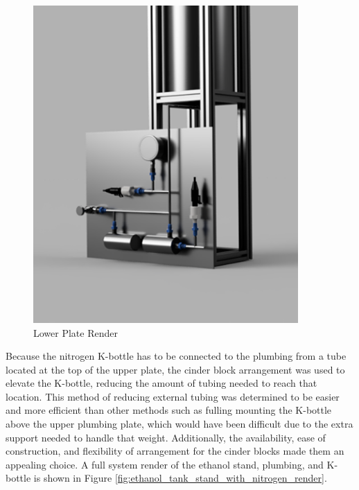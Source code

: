 \documentclass[9pt]{article} %
\numberwithin{equation}{section} %
\begin{document}
\begin{figure}[!htb]
\begin{minipage}{0.49\textwidth}
        \includegraphics[scale=0.5, width=0.9\textwidth]{lower_plate.png} %
        \caption{Lower Plate Render}
        \label{fig:lower_plate_render}
    \end{minipage}
\end{figure} 

\hspace{\parindent} Because the nitrogen K-bottle has to be connected to the plumbing from a tube located at the top of the upper plate, the cinder block arrangement was used to elevate the K-bottle, reducing the amount of tubing needed to reach that location. This method of reducing external tubing was determined to be easier and more efficient than other methods such as fulling mounting the K-bottle above the upper plumbing plate, which would have been difficult due to the extra support needed to handle that weight. Additionally, the availability, ease of construction, and flexibility of arrangement for the cinder blocks made them an appealing choice. A full system render of the ethanol stand, plumbing, and K-bottle is shown in Figure \ref{fig:ethanol_tank_stand_with_nitrogen_render}.
\end{document}
